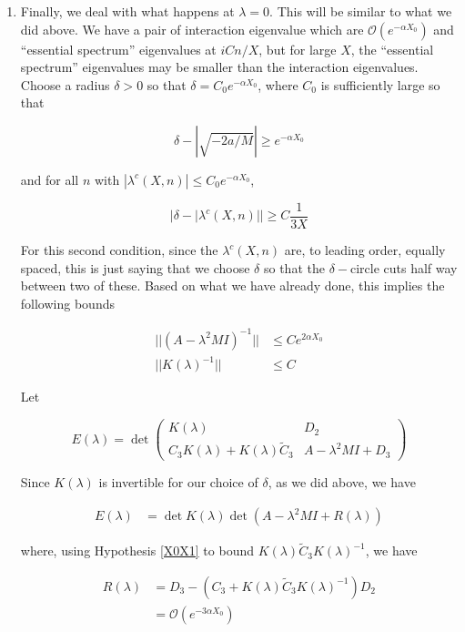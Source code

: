 \documentclass[12pt]{article}
\begin{document}
\begin{enumerate}
\item Finally, we deal with what happens at $\lambda = 0$. This will be similar to what we did above. We have a pair of interaction eigenvalue which are $\mathcal{O}(e^{-\alpha X_0})$ and ``essential spectrum'' eigenvalues at $i C n /X$, but for large $X$, the ``essential spectrum'' eigenvalues may be smaller than the interaction eigenvalues.\\

 Choose a radius $\delta > 0$ so that $\delta = C_0 e^{-\alpha X_0}$, where $C_0$ is sufficiently large so that

\[
\delta - |\sqrt{-2a/M}| \geq e^{-\alpha X_0}
\]

and for all $n$ with $|\lambda^c(X, n)| \leq C_0 e^{-\alpha X_0}$,

\[
|\delta - |\lambda^c(X, n)| | \geq C \frac{1}{3X}
\]

For this second condition, since the $\lambda^c(X, n)$ are, to leading order, equally spaced, this is just saying that we choose $\delta$ so that the $\delta-$circle cuts half way between two of these. Based on what we have already done, this implies the following bounds

\begin{align*}
||(A - \lambda^2 M I)^{-1}|| &\leq C e^{2 \alpha X_0} \\
||K(\lambda)^{-1}|| &\leq C 
\end{align*}

Let

\begin{equation}
E(\lambda) = \det
\begin{pmatrix}
K(\lambda) & D_2 \\
C_3 K(\lambda) + K(\lambda) \tilde{C}_3 & A - \lambda^2 MI + D_3
\end{pmatrix}
\end{equation}

Since $K(\lambda)$ is invertible for our choice of $\delta$, as we did above, we have

\begin{align*}
E(\lambda) &= \det K(\lambda) \det(A - \lambda^2 MI + R(\lambda) )
\end{align*}

where, using Hypothesis \ref{X0X1} to bound $K(\lambda) \tilde{C}_3 K(\lambda)^{-1}$, we have

\begin{align*}
R(\lambda) &= D_3 - (C_3 + K(\lambda) \tilde{C}_3 K(\lambda)^{-1} ) D_2 \\
&= \mathcal{O}(e^{-3 \alpha X_0})
\end{align*}


\end{enumerate}
\end{document}
